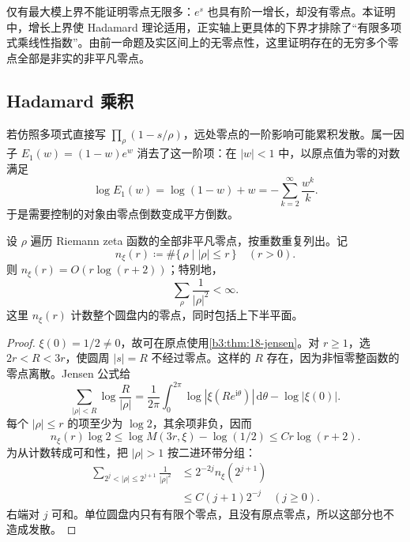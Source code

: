 仅有最大模上界不能证明零点无限多：\(e^s\) 也具有阶一增长，却没有零点。本证明中，增长上界使 Hadamard 理论适用，正实轴上更具体的下界才排除了“有限多项式乘线性指数”。由前一命题及实区间上的无零点性，这里证明存在的无穷多个零点全部是非实的非平凡零点。

\subsection{Hadamard 乘积}
\label{b3:subsec:260603}

若仿照多项式直接写 \(\prod_\rho(1-s/\rho)\)，远处零点的一阶影响可能累积发散。属一因子 \(E_1(w)=(1-w)e^w\) 消去了这一阶项：在 \(|w|<1\) 中，以原点值为零的对数满足
\[
 \log E_1(w)=\log(1-w)+w=-\sum_{k=2}^\infty\frac{w^k}{k}.
\]
于是需要控制的对象由零点倒数变成平方倒数。

\begin{proposition}[零点计数的上界]\label{b3:prop:26-zero-count-bound}
设 \(\rho\) 遍历 Riemann zeta 函数的全部非平凡零点，按重数重复列出。记
\[
 n_\xi(r)\coloneqq\#\{\,\rho\mid |\rho|\le r\,\}\quad(r>0).
\]
则 \(n_\xi(r)=O(r\log(r+2))\)；特别地，
\[
 \sum_\rho\frac1{|\rho|^2}<\infty.
\]
这里 \(n_\xi(r)\) 计数整个圆盘内的零点，同时包括上下半平面。
\end{proposition}
\begin{proof}
\(\xi(0)=1/2\ne0\)，故可在原点使用\cref{b3:thm:18-jensen}。对 \(r\ge1\)，选 \(2r<R<3r\)，使圆周 \(|s|=R\) 不经过零点。这样的 \(R\) 存在，因为非恒零整函数的零点离散。Jensen 公式给
\[
 \sum_{|\rho|<R}\log\frac R{|\rho|}
 =\frac1{2\pi}\int_0^{2\pi}\log|\xi(Re^{\mathrm i\theta})|\,\mathrm d\theta
          -\log|\xi(0)|.
\]
每个 \(|\rho|\le r\) 的项至少为 \(\log2\)，其余项非负，因而
\[
 n_\xi(r)\log2\le\log M(3r,\xi)-\log(1/2)
                    \le Cr\log(r+2).
\]
为从计数转成可和性，把 \(|\rho|>1\) 按二进环带分组：
\[
 \begin{aligned}
 \sum_{2^j<|\rho|\le2^{j+1}}\frac1{|\rho|^2}
 &\le 2^{-2j}n_\xi(2^{j+1})\\
 &\le C(j+1)2^{-j}\quad(j\ge0).
 \end{aligned}
\]
右端对 \(j\) 可和。单位圆盘内只有有限个零点，且没有原点零点，所以这部分也不造成发散。
\end{proof}


